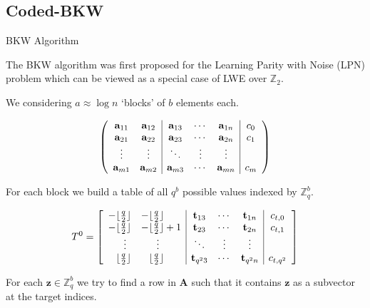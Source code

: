 \documentclass[10pt,compress]{beamer}
\renewcommand{\vec}[1]{\mathbf{#1}\xspace}
\renewcommand{\vec}[1]{\mathbf{#1}\xspace}
\newcommand{\Z}{\ensuremath{\mathbb{Z}}\xspace}
\begin{document}
\subsection{Coded-BKW}

\begin{frame}{BKW Algorithm}

The BKW algorithm was first proposed for the Learning Parity with Noise (LPN) problem which can be viewed as a special case of LWE over $\Z_{2}$.

\framebreak{}

We considering $a \approx \log n$ `blocks' of $b$ elements each.

\begin{equation*}
\left(\begin{array}{cc|ccc|c}
\bold{a}_{11} & \bold{a}_{12} & \bold{a}_{13} & \cdots & \bold{a}_{1n} & c_0\\
\bold{a}_{21} & \bold{a}_{22} & \bold{a}_{23} & \cdots & \bold{a}_{2n} & c_1\\
\vdots & \vdots & \ddots & \vdots & \vdots\\
\bold{a}_{m1} & \bold{a}_{m2} & \bold{a}_{m3} & \cdots & \bold{a}_{mn} & c_{m}
\end{array}\right)
\end{equation*}

\framebreak{}

For each block we build a table of all $q^b$ possible values indexed by $\Z_q^b$.

\begin{equation*}
T^0 = \left[ 
\begin{array}{ll|ccc|c}
-\lfloor\frac{q}{2}\rfloor & -\lfloor\frac{q}{2}\rfloor & \bold{t}_{13} & \cdots & \bold{t}_{1n} & c_{t,0}\\
-\lfloor\frac{q}{2}\rfloor & -\lfloor\frac{q}{2}\rfloor+1 & \bold{t}_{23} & \cdots & \bold{t}_{2n} & c_{t,1}\\
\phantom{--}\vdots & \phantom{--}\vdots & \ddots & \vdots & \vdots\\
\phantom{-}\lfloor\frac{q}{2}\rfloor & \phantom{-}\lfloor\frac{q}{2}\rfloor& \bold{t}_{q^23} & \cdots & \bold{t}_{q^2n} & c_{t,q^2}
\end{array}\right]
\end{equation*}

For each $\vec{z} \in \Z_q^b$ we try to find a row in $\vec{A}$ such that it contains $\vec{z}$ as a subvector at the target indices.

\framebreak{}


\end{frame}
\end{document}
